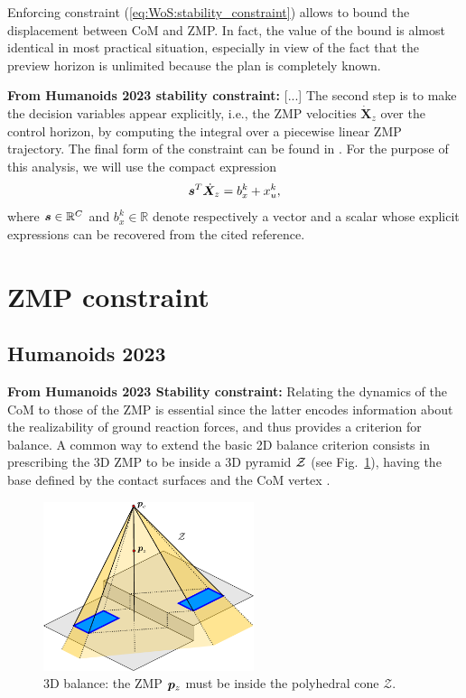 Enforcing constraint (\ref{eq:WoS:stability_constraint}) allows to bound the displacement between CoM and ZMP. In fact, the value of the bound is almost identical in most practical situation, especially in view of the fact that the preview horizon is unlimited because the plan is completely known.

\textbf{From Humanoids 2023 stability constraint:}
[...] The second step is to make the decision variables appear explicitly, i.e., the ZMP velocities $\dot{\bm{X}}_z$ over the control horizon, by computing the integral over a piecewise linear ZMP trajectory. The final form of the constraint can be found in \cite{ScDeLaOr:20}. For the purpose of this analysis, we will use the compact expression
\begin{equation}\label{eq:FAPA:stability_constraint}
    {\bm{s}}^T \dot{\bm{X}}_z = b_x^k + x_u^k,
\end{equation}
where ${\bm{s}}\in\mathbb{R}^C$ and $b_x^k\in\mathbb{R}$ denote respectively a vector and a scalar whose explicit expressions can be recovered from the cited reference.


\section{ZMP constraint}
\subsection{Humanoids 2023}
\textbf{From Humanoids 2023 Stability constraint:} Relating the dynamics of the CoM to those of the ZMP is essential since the latter encodes information about the realizability of ground reaction forces, and thus provides a criterion for balance. 
A common way to extend the basic 2D balance criterion consists in prescribing the 3D ZMP to be inside a 3D pyramid $\cal Z$ (see Fig.~\ref{fig:FAPA:balance3D}), having the base defined by the contact surfaces and the CoM vertex \cite{Sugihara2002ICRA, Cipriano2023RAS}.

\begin{figure}
    \centering
    \includegraphics[width=0.55\textwidth]{figures/balance3d.pdf}
    \caption{3D balance: the ZMP ${\bm{p}}_z$ must be inside the polyhedral cone $\mathcal{Z}$.}
    \label{fig:FAPA:balance3D}
\end{figure}

